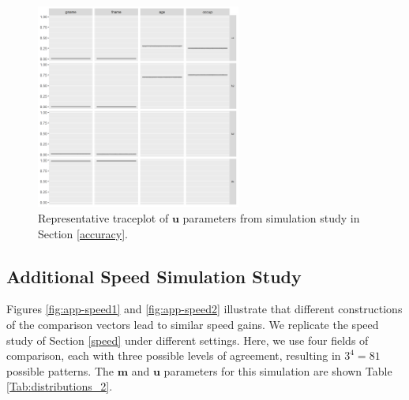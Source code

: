 \documentclass[ba]{imsart}
\begin{document}
	\begin{figure}[!h]
		\begin{center}
			\includegraphics[width=0.6\textwidth]{../notes/figures/sim_u_trace} 
			\caption{Representative traceplot of $\bm{u}$ parameters from simulation study in Section \ref{accuracy}.}\label{fig:sim_u_trace}
		\end{center}
	\end{figure}

\clearpage

	\hypertarget{appendix-speed}{%
	\subsection{Additional Speed Simulation Study}\label{app:appendix-speed}}
	Figures \ref{fig:app-speed1} and \ref{fig:app-speed2} illustrate that different constructions of the comparison vectors lead to similar speed gains. We replicate the speed study of Section \ref{speed} under different settings. Here, we use four fields of comparison, each with three possible levels of agreement, resulting in $3^4 = 81$ possible patterns. The $\bm{m}$ and $\bm{u}$ parameters for this simulation are shown Table \ref{Tab:distributions_2}.
	
\end{document}
